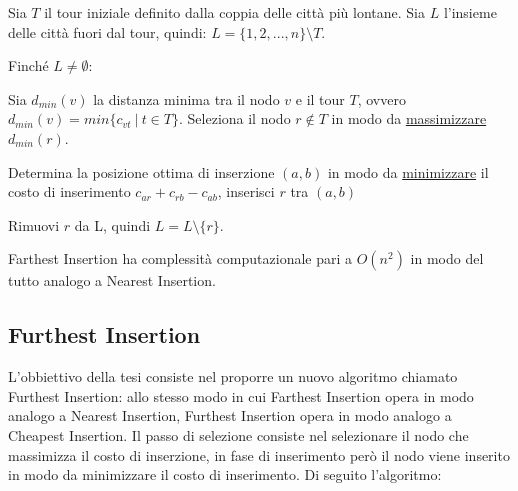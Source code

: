 \documentclass[a4paper,12pt]{report}
\begin{document}
\begin{tcolorbox}[colframe=black,colback=white,boxrule=0.5pt, sharp corners, breakable]
\begin{legal}
  \item Sia $T$ il tour iniziale definito dalla coppia delle città più lontane. Sia $L$ l'insieme delle città fuori dal tour, quindi: $L = \{1, 2, ..., n\} \setminus T$.
  \item Finché $L \neq \emptyset$:
  \begin{legal}
    \item Sia $d_{min}(v)$ la distanza minima tra il nodo $v$ e il tour $T$, ovvero $d_{min}(v) = min\{c_{vt} \  | \ t \in T \}$. Seleziona il nodo $r \not \in T$ in modo da \underline{massimizzare} $d_{min}(r)$.
    \item Determina la posizione ottima di inserzione $(a, b)$ in modo da \underline{minimizzare} il costo di inserimento $c_{ar} + c_{rb} - c_{ab}$, inserisci $r$ tra $(a, b)$
    \item Rimuovi $r$ da L, quindi $L = L \setminus \{r\}$.
  \end{legal}
\end{legal}
\end{tcolorbox}
\hfill \break Farthest Insertion ha complessità computazionale pari a $O(n^2)$ in modo del tutto analogo a Nearest Insertion.

\subsection{Furthest Insertion} \label{ssec:FuI}
L'obbiettivo della tesi consiste nel proporre un nuovo algoritmo chiamato Furthest Insertion: allo stesso modo in cui Farthest Insertion opera in modo analogo a Nearest Insertion, Furthest Insertion opera in modo analogo a Cheapest Insertion. Il passo di selezione consiste nel selezionare il nodo che massimizza il costo di inserzione, in fase di inserimento però il nodo viene inserito in modo da minimizzare il costo di inserimento. Di seguito l'algoritmo:
\end{document}
